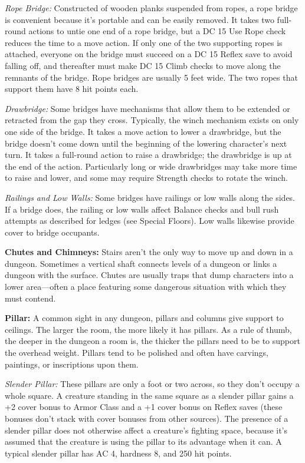 \documentclass{article}
\begin{document}
\textit{Rope Bridge: }Constructed of wooden planks suspended from ropes, a rope 
bridge is convenient because it's portable and can be easily removed. It takes 
two full-round actions to untie one end of a rope bridge, but a DC 15 Use Rope 
check reduces the time to a move action. If only one of the two supporting ropes 
is attached, everyone on the bridge must succeed on a DC 15 Reflex save to avoid 
falling off, and thereafter must make DC 15 Climb checks to move along the remnants 
of the bridge. Rope bridges are usually 5 feet wide. The two ropes that support 
them have 8 hit points each.

\textit{Drawbridge: }Some bridges have mechanisms that allow them to be extended 
or retracted from the gap they cross. Typically,  the winch mechanism exists on 
only one side of the bridge. It takes a move action to lower a drawbridge, but 
the bridge doesn't come down until the beginning of the lowering character's next 
turn. It takes a full-round action to raise a drawbridge; the drawbridge is up 
at the end of the action. Particularly long or wide drawbridges may take more time 
to raise and lower, and some may require Strength checks to rotate the winch.

\textit{Railings and Low Walls: }Some bridges have railings or low walls along 
the sides. If a bridge does, the railing or low walls affect Balance checks and 
bull rush attempts as described for ledges (see Special Floors). Low walls likewise 
provide cover to bridge occupants.

\textbf{Chutes and Chimneys:} Stairs aren't the only way to move up and down in 
a dungeon. Sometimes a vertical shaft connects levels of a dungeon or links a dungeon 
with the surface. Chutes are usually traps that dump characters into a lower area---often 
a place featuring some dangerous situation with which they must contend.

\textbf{Pillar:} A common sight in any dungeon, pillars and columns give support 
to ceilings. The larger the room, the more likely it has pillars. As a rule of 
thumb, the deeper in the dungeon a room is, the thicker the pillars need to be 
to support the overhead weight. Pillars tend to be polished and often have carvings, 
paintings, or inscriptions upon them. 

\textit{Slender Pillar: }These pillars are only a foot or two across, so they don't 
occupy a whole square. A creature standing in the same square as a slender pillar 
gains a +2 cover bonus to Armor Class and a +1 cover bonus on Reflex saves (these 
bonuses don't stack with cover bonuses from other sources). The presence of a slender 
pillar does not otherwise affect a creature's fighting space, because it's assumed 
that the creature is using the pillar to its advantage when it can. A typical slender 
pillar has AC 4, hardness 8, and 250 hit points.
\end{document}
